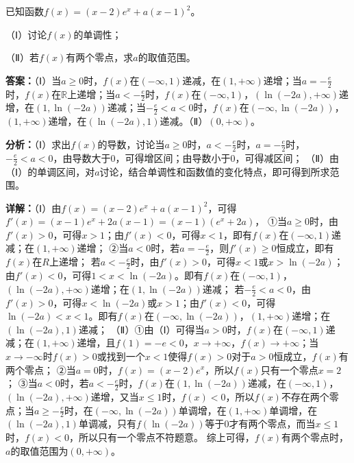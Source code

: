 \begin{question}[points=12]
已知函数$f(x)=(x-2)e^x+a(x-1)^2$。

（Ⅰ）讨论$f(x)$的单调性；

（Ⅱ）若$f(x)$有两个零点，求$a$的取值范围。
\begin{solution}
\textbf{答案：}（Ⅰ）当$a\ge0$时，$f(x)$在$(-\infty,1)$递减，在$(1,+\infty)$递增；当$a=-\frac{e}{2}$时，$f(x)$在$\mathbb{R}$上递增；当$a<-\frac{e}{2}$时，$f(x)$在$(-\infty,1)$，$(\ln(-2a),+\infty)$递增，在$(1,\ln(-2a))$递减；当$-\frac{e}{2}<a<0$时，$f(x)$在$(-\infty,\ln(-2a))$，$(1,+\infty)$递增，在$(\ln(-2a),1)$递减。（Ⅱ）$(0,+\infty)$。

\textbf{分析：}（Ⅰ）求出$f(x)$的导数，讨论当$a\ge0$时，$a<-\frac{e}{2}$时，$a=-\frac{e}{2}$时，$-\frac{e}{2}<a<0$，由导数大于0，可得增区间；由导数小于0，可得减区间；
（Ⅱ）由（Ⅰ）的单调区间，对$a$讨论，结合单调性和函数值的变化特点，即可得到所求范围。

\textbf{详解：}（Ⅰ）由$f(x)=(x-2)e^x+a(x-1)^2$，可得$f'(x)=(x-1)e^x+2a(x-1)=(x-1)(e^x+2a)$，
①当$a\ge0$时，由$f'(x)>0$，可得$x>1$；由$f'(x)<0$，可得$x<1$，即有$f(x)$在$(-\infty,1)$递减；在$(1,+\infty)$递增；
②当$a<0$时，若$a=-\frac{e}{2}$，则$f'(x)\ge0$恒成立，即有$f(x)$在$R$上递增；
若$a<-\frac{e}{2}$时，由$f'(x)>0$，可得$x<1$或$x>\ln(-2a)$；由$f'(x)<0$，可得$1<x<\ln(-2a)$。即有$f(x)$在$(-\infty,1)$，$(\ln(-2a),+\infty)$递增；在$(1,\ln(-2a))$递减；
若$-\frac{e}{2}<a<0$，由$f'(x)>0$，可得$x<\ln(-2a)$或$x>1$；由$f'(x)<0$，可得$\ln(-2a)<x<1$。即有$f(x)$在$(-\infty,\ln(-2a))$，$(1,+\infty)$递增；在$(\ln(-2a),1)$递减；
（Ⅱ）①由（Ⅰ）可得当$a>0$时，$f(x)$在$(-\infty,1)$递减；在$(1,+\infty)$递增，且$f(1)=-e<0$，$x\to+\infty$，$f(x)\to+\infty$；当$x\to-\infty$时$f(x)>0$或找到一个$x<1$使得$f(x)>0$对于$a>0$恒成立，$f(x)$有两个零点；
②当$a=0$时，$f(x)=(x-2)e^x$，所以$f(x)$只有一个零点$x=2$；
③当$a<0$时，若$a<-\frac{e}{2}$时，$f(x)$在$(1,\ln(-2a))$递减，在$(-\infty,1)$，$(\ln(-2a),+\infty)$递增，又当$x\le1$时，$f(x)<0$，所以$f(x)$不存在两个零点；当$a\ge-\frac{e}{2}$时，在$(-\infty,\ln(-2a))$单调增，在$(1,+\infty)$单调增，在$(\ln(-2a),1)$单调减，只有$f(\ln(-2a))$等于0才有两个零点，而当$x\le1$时，$f(x)<0$，所以只有一个零点不符题意。
综上可得，$f(x)$有两个零点时，$a$的取值范围为$(0,+\infty)$。
\end{solution}
\end{question}

